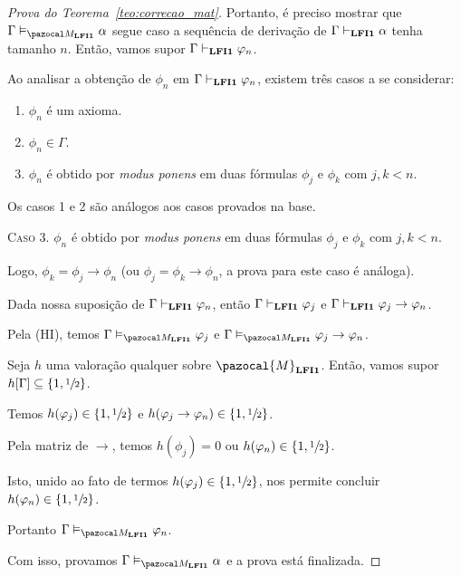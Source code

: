 \begin{proof}[Prova do Teorema~\ref{teo:correcao_mat}]
            Portanto, é preciso mostrar que $\Gamma \conmat \alpha$ segue caso a sequência de derivação de $\Gamma \vdash_{{\normalfont\textbf{LFI1}}{}} \alpha$ tenha tamanho $n$. Então, vamos supor $\Gamma \vdash_{{\normalfont\textbf{LFI1}}{}} \varphi_{n}$.
            
            Ao analisar a obtenção de $\phi_{n}$ em $\Gamma \vdash_{{\normalfont\textbf{LFI1}}{}} \varphi_{n}$, existem três casos a se considerar:
            
            \begin{enumerate}
                \item $\phi_{n}$ é um axioma.
                \item $\phi_{n} \in \Gamma$.
                \item $\phi_{n}$ é obtido por \textit{modus ponens} em duas fórmulas $\phi_{j}$ e $\phi_{k}$ com $j, k < n$. 
            \end{enumerate}
            
            Os casos 1 e 2 são análogos aos casos provados na base.
            
            \noindent \textsc{Caso 3.} $\phi_{n}$ é obtido por \textit{modus ponens} em duas fórmulas $\phi_{j}$ e $\phi_{k}$ com $j, k < n$. 
            
            Logo, $\phi_{k} = \phi_{j} \to \phi_{n}$ (ou $\phi_{j} = \phi_{k} \to \phi_{n}$, a prova para este caso é análoga). 
            
            Dada nossa suposição de $\Gamma \vdash_{{\normalfont\textbf{LFI1}}{}} \varphi_{n}$, então $\Gamma \vdash_{{\normalfont\textbf{LFI1}}{}} \varphi_{j}$ e $\Gamma \vdash_{{\normalfont\textbf{LFI1}}{}} \varphi_{j} \to \varphi_{n}$. 
            
            Pela (HI), temos $\Gamma \conmat \phi_{j}$ e $\Gamma \conmat \phi_{j} \to \phi_{n}$.

            Seja $h$ uma valoração qualquer sobre $\pazocal{M}_{\lfium{}}$. Então, vamos supor $h[\Gamma] \subseteq \{1, \sfrac{1}{2}{}\}$. 
            
            Temos $h(\varphi_{j}) \in \{1, \sfrac{1}{2}{}\}$ e $h(\varphi_{j} \to \varphi_{n}) \in \{1,\sfrac{1}{2}{}\}$. 
            
            Pela matriz de $\to$, temos $h(\phi_{j}) = 0$ ou $h(\varphi_{n}) \in \{1,\sfrac{1}{2}{}\}$. 
            
            Isto, unido ao fato de termos $h(\varphi_{j}) \in \{1,\sfrac{1}{2}{}\}$, nos permite concluir $h(\varphi_{n}) \in \{1,\sfrac{1}{2}{}\}$. 
            
            Portanto $\Gamma \conmat \phi_{n}$.

            \noindent Com isso, provamos $\Gamma \conmat \alpha$ e a prova está finalizada.

        \end{proof}

